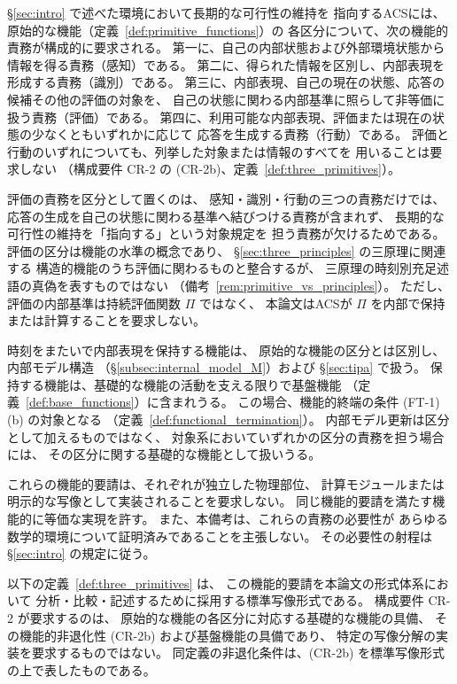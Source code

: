 \begin{remark}
\label{rem:three_primitives_necessity}
\S\ref{sec:intro} で述べた環境において長期的な可行性の維持を
指向するACSには、原始的な機能（定義~\ref{def:primitive_functions}）の
各区分について、次の機能的責務が構成的に要求される。
第一に、自己の内部状態および外部環境状態から情報を得る責務（感知）である。
第二に、得られた情報を区別し、内部表現を形成する責務（識別）である。
第三に、内部表現、自己の現在の状態、応答の候補その他の評価の対象を、
自己の状態に関わる内部基準に照らして非等価に扱う責務（評価）である。
第四に、利用可能な内部表現、評価または現在の状態の少なくともいずれかに応じて
応答を生成する責務（行動）である。
評価と行動のいずれについても、列挙した対象または情報のすべてを
用いることは要求しない
（構成要件 CR-2 の (CR-2b)、定義~\ref{def:three_primitives}）。

評価の責務を区分として置くのは、
感知・識別・行動の三つの責務だけでは、
応答の生成を自己の状態に関わる基準へ結びつける責務が含まれず、
長期的な可行性の維持を「指向する」という対象規定を
担う責務が欠けるためである。
評価の区分は機能の水準の概念であり、
\S\ref{sec:three_principles} の三原理に関連する
構造的機能のうち評価に関わるものと整合するが、
三原理の時刻別充足述語の真偽を表すものではない
（備考~\ref{rem:primitive_vs_principles}）。
ただし、評価の内部基準は持続評価関数 $\Pi$ ではなく、
本論文はACSが $\Pi$ を内部で保持または計算することを要求しない。

時刻をまたいで内部表現を保持する機能は、
原始的な機能の区分とは区別し、内部モデル構造
（\S\ref{subsec:internal_model_M}）および
\S\ref{sec:tipa} で扱う。
保持する機能は、基礎的な機能の活動を支える限りで基盤機能
（定義~\ref{def:base_functions}）に含まれうる。
この場合、機能的終端の条件 (FT-1)(b) の対象となる
（定義~\ref{def:functional_termination}）。
内部モデル更新は区分として加えるものではなく、
対象系においていずれかの区分の責務を担う場合には、
その区分に関する基礎的な機能として扱いうる。

これらの機能的要請は、それぞれが独立した物理部位、
計算モジュールまたは明示的な写像として実装されることを要求しない。
同じ機能的要請を満たす機能的に等価な実現を許す。
また、本備考は、これらの責務の必要性が
あらゆる数学的環境について証明済みであることを主張しない。
その必要性の射程は \S\ref{sec:intro} の規定に従う。

以下の定義~\ref{def:three_primitives} は、
この機能的要請を本論文の形式体系において
分析・比較・記述するために採用する標準写像形式である。
構成要件 CR-2 が要求するのは、
原始的な機能の各区分に対応する基礎的な機能の具備、
その機能的非退化性 (CR-2b) および基盤機能の具備であり、
特定の写像分解の実装を要求するものではない。
同定義の非退化条件は、(CR-2b) を標準写像形式の上で表したものである。
\end{remark}

